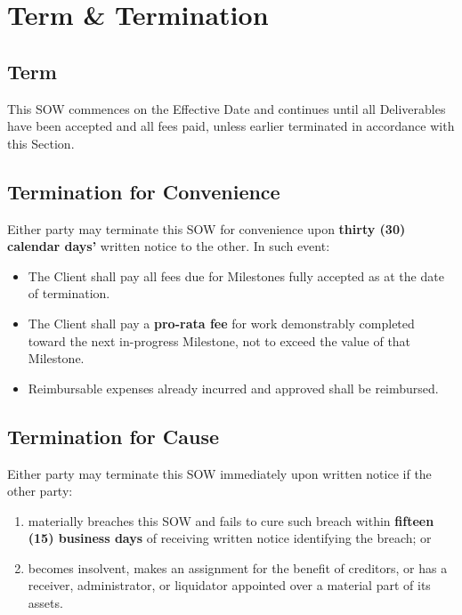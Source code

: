 \section{Term \& Termination}

\subsection{Term}

This SOW commences on the Effective Date and continues until all Deliverables have been
accepted and all fees paid, unless earlier terminated in accordance with this Section.

\subsection{Termination for Convenience}

Either party may terminate this SOW for convenience upon \textbf{thirty (30) calendar
days'} written notice to the other. In such event:

\begin{itemize}
  \item The Client shall pay all fees due for Milestones fully accepted as at the
    date of termination.
  \item The Client shall pay a \textbf{pro-rata fee} for work demonstrably completed
    toward the next in-progress Milestone, not to exceed the value of that Milestone.
  \item Reimbursable expenses already incurred and approved shall be reimbursed.
\end{itemize}

\subsection{Termination for Cause}

Either party may terminate this SOW immediately upon written notice if the other party:

\begin{enumerate}[label=(\alph*)]
  \item materially breaches this SOW and fails to cure such breach within \textbf{fifteen
    (15) business days} of receiving written notice identifying the breach; or
  \item becomes insolvent, makes an assignment for the benefit of creditors, or has a
    receiver, administrator, or liquidator appointed over a material part of its assets.
\end{enumerate}


